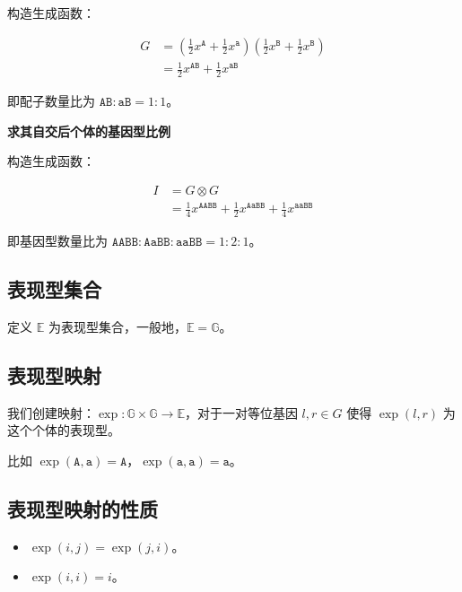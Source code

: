 \documentclass{article}
\begin{document}
构造生成函数：

$$\begin{aligned}
    G &= (\frac{1}{2} x^{\texttt{A}}+ \frac{1}{2}x^{\texttt{a}})(\frac{1}{2} x^{\texttt{B}}+ \frac{1}{2}x^{\texttt{B}}) \\
                &= \frac{1}{2} x^{\texttt{AB}} + \frac{1}{2} x^{\texttt{aB}}
\end{aligned}$$

即配子数量比为 $\texttt{AB} : \texttt{aB}=1:1$。

\textbf{求其自交后个体的基因型比例}

构造生成函数：

$$\begin{aligned}
    I &= G \otimes G \\
        &= \frac{1}{4} x^{\texttt{AABB}} + \frac{1}{2} x^{\texttt{AaBB}} + \frac{1}{4} x^{\texttt{aaBB}}
\end{aligned}$$

即基因型数量比为 $\texttt{AABB} : \texttt{AaBB} : \texttt{aaBB}=1:2:1$。

\subsection{表现型集合}

定义 $\mathbb{E}$ 为表现型集合，一般地，$\mathbb{E}=\mathbb{G}$。

\subsection{表现型映射}

我们创建映射：$\operatorname{exp}:\mathbb{G} \times \mathbb{G} \to \mathbb{E}$，对于一对等位基因 $l,r \in G$ 使得 $\operatorname{exp}(l,r)$ 为这个个体的表现型。


比如 $\operatorname{exp}(\texttt{A},\texttt{a})=\texttt{A}$，$\operatorname{exp}(\texttt{a},\texttt{a})=\texttt{a}$。

\subsection{表现型映射的性质}

\begin{itemize}
    \item $\operatorname{exp}(i,j)=\operatorname{exp}(j,i)$。
    \item $\operatorname{exp}(i,i)=i$。
\end{itemize}
\end{document}

